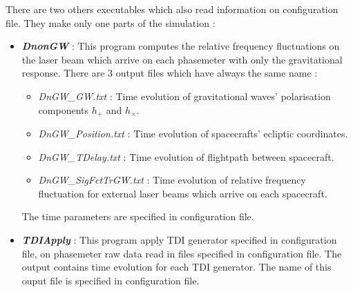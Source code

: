 \documentclass[a4paper,english,12pt]{article}
\begin{document}
There are two others executables which also read information on configuration file. They make only one parts of the simulation : \\
\begin{itemize}
\item {\it \bf DnonGW} : This program computes the relative frequency fluctuations on the laser beam which arrive on each phasemeter with only the gravitational response.  There are 3 output files which have always the same name : \\
\begin{itemize}
\item {\it DnGW\_GW.txt} : Time evolution of gravitational waves' polarisation components $h_+$ and $h_\times$.
\item {\it DnGW\_Position.txt} : Time evolution of spacecrafts' ecliptic coordinates.
\item {\it DnGW\_TDelay.txt} : Time evolution of flightpath between spacecraft.
\item {\it DnGW\_SigFctTrGW.txt} : Time evolution of relative frequency fluctuation for external laser beams which arrive on each spacecraft.
\end{itemize}
The time parameters are specified in configuration file.\\

\item {\it \bf TDIApply} : This program apply TDI generator specified in configuration file, on phasemeter raw data read in files specified in configuration file. The output contains time evolution for each TDI generator. The name of this ouput file is specified in configuration file.
\end{itemize}
\end{document}
